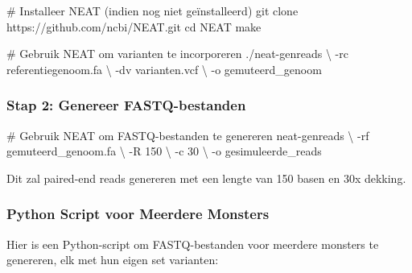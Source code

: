 \documentclass[
  letterpaper,
  DIV=11,
  numbers=noendperiod]{scrartcl}
\newenvironment{Shaded}{\begin{snugshade}}{\end{snugshade}}
\newcommand{\AttributeTok}[1]{\textcolor[rgb]{0.40,0.45,0.13}{#1}}
\newcommand{\BuiltInTok}[1]{\textcolor[rgb]{0.00,0.23,0.31}{#1}}
\newcommand{\CommentTok}[1]{\textcolor[rgb]{0.37,0.37,0.37}{#1}}
\newcommand{\DataTypeTok}[1]{\textcolor[rgb]{0.68,0.00,0.00}{#1}}
\newcommand{\ExtensionTok}[1]{\textcolor[rgb]{0.00,0.23,0.31}{#1}}
\newcommand{\FunctionTok}[1]{\textcolor[rgb]{0.28,0.35,0.67}{#1}}
\newcommand{\NormalTok}[1]{\textcolor[rgb]{0.00,0.23,0.31}{#1}}
\begin{document}
\begin{Shaded}
\begin{Highlighting}[]
\CommentTok{\# Installeer NEAT (indien nog niet geïnstalleerd)}
\FunctionTok{git}\NormalTok{ clone https://github.com/ncbi/NEAT.git}
\BuiltInTok{cd}\NormalTok{ NEAT}
\FunctionTok{make}

\CommentTok{\# Gebruik NEAT om varianten te incorporeren}
\ExtensionTok{./neat{-}genreads} \DataTypeTok{\textbackslash{}}
  \AttributeTok{{-}rc}\NormalTok{ referentiegenoom.fa }\DataTypeTok{\textbackslash{}}
  \AttributeTok{{-}dv}\NormalTok{ varianten.vcf }\DataTypeTok{\textbackslash{}}
  \AttributeTok{{-}o}\NormalTok{ gemuteerd\_genoom}
\end{Highlighting}
\end{Shaded}

\subsubsection{Stap 2: Genereer
FASTQ-bestanden}\label{stap-2-genereer-fastq-bestanden}

\begin{Shaded}
\begin{Highlighting}[]
\CommentTok{\# Gebruik NEAT om FASTQ{-}bestanden te genereren}
\ExtensionTok{neat{-}genreads} \DataTypeTok{\textbackslash{}}
  \AttributeTok{{-}rf}\NormalTok{ gemuteerd\_genoom.fa }\DataTypeTok{\textbackslash{}}
  \AttributeTok{{-}R}\NormalTok{ 150 }\DataTypeTok{\textbackslash{}}
  \AttributeTok{{-}c}\NormalTok{ 30 }\DataTypeTok{\textbackslash{}}
  \AttributeTok{{-}o}\NormalTok{ gesimuleerde\_reads}
\end{Highlighting}
\end{Shaded}

Dit zal paired-end reads genereren met een lengte van 150 basen en 30x
dekking.

\subsubsection{Python Script voor Meerdere
Monsters}\label{python-script-voor-meerdere-monsters}

Hier is een Python-script om FASTQ-bestanden voor meerdere monsters te
genereren, elk met hun eigen set varianten:
\end{document}
